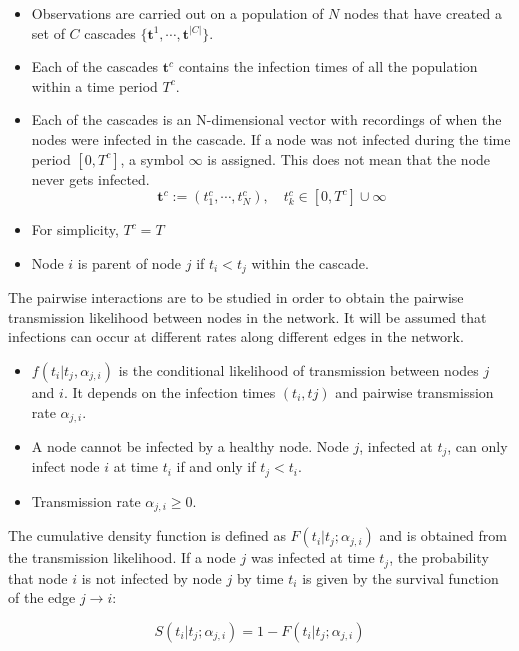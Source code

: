 \documentclass[10pt]{article}
\begin{document}
\begin{itemize}
\item Observations are carried out on a population of $N$ nodes that have created a set of $C$ cascades $\{\textbf{t}^{1},\cdots,\textbf{t}^{|C|}\}$. 
\item Each of the cascades $\textbf{t}^{c}$ contains the infection times of all the population within a time period $T^{c}$.
\item Each of the cascades is an N-dimensional vector with recordings of when the nodes were infected in the cascade. If a node was not infected during the time period $[0,T^{c}]$, a symbol $\infty$ is assigned. This does not mean that the node never gets infected.
\begin{equation}\label{eq:data_netrate}
\textbf{t}^{c}:=(t_{1}^{c},\cdots,t_{N}^{c}),\quad t_{k}^{c}\in [0,T^{c}]\cup{\infty}
\end{equation}
\item For simplicity, $T^{c}=T$
\item Node $i$ is parent of node $j$ if $t_{i}<t_{j}$ within the cascade.
\end{itemize}

The pairwise interactions are to be studied in order to obtain the pairwise transmission likelihood between nodes in the network. It will be assumed that infections can occur at different rates along different edges in the network. 

\begin{itemize}
\item $f(t_{i}|t_{j},\alpha _{j,i})$ is the conditional likelihood of transmission between nodes $j$ and $i$. It depends on the infection times $(t_{i},t{j})$ and pairwise transmission rate $\alpha_{j,i}$.
\item A node cannot be infected by a healthy node. Node $j$, infected at $t_{j}$, can only infect node $i$ at time $t_{i}$ if and only if $t_{j}<t_{i}$.
\item Transmission rate $\alpha _{j,i}\geq0$.
\end{itemize}

The cumulative density function is defined as $F(t_{i}|t_{j};\alpha _{j,i})$ and is obtained from the transmission likelihood. If a node $j$ was infected at time $t_{j}$, the probability that node $i$ is not infected by node $j$ by time $t_{i}$ is given by the survival function of the edge $j\rightarrow i$:

\begin{equation}\label{eq:survival_function}
S(t_{i}|t_{j};\alpha _{j,i})=1-F(t_{i}|t_{j};\alpha _{j,i})
\end{equation}
\end{document}
